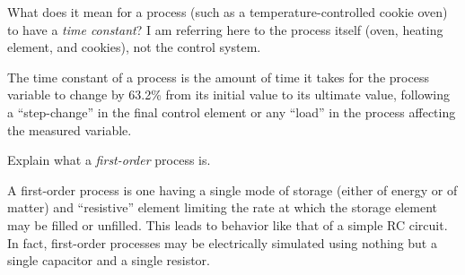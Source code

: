




What does it mean for a process (such as a temperature-controlled cookie oven) to have a {\it time constant}?  I am referring here to the process itself (oven, heating element, and cookies), not the control system.







The time constant of a process is the amount of time it takes for the process variable to change by 63.2\% from its initial value to its ultimate value, following a ``step-change'' in the final control element or any ``load'' in the process affecting the measured variable.














Explain what a {\it first-order} process is.







A first-order process is one having a single mode of storage (either of energy or of matter) and ``resistive'' element limiting the rate at which the storage element may be filled or unfilled.  This leads to behavior like that of a simple RC circuit.  In fact, first-order processes may be electrically simulated using nothing but a single capacitor and a single resistor.

